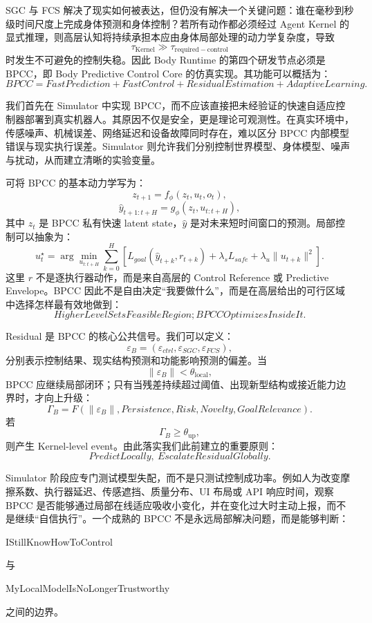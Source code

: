 SGC 与 FCS 解决了现实如何被表达，但仍没有解决一个关键问题：谁在毫秒到秒级时间尺度上完成身体预测和身体控制？若所有动作都必须经过 Agent Kernel 的显式推理，则高层认知将持续承担本应由身体局部处理的动力学复杂度，导致
\[
\tau_{\mathrm{Kernel}}
\gg
\tau_{\mathrm{required-control}}
\]
时发生不可避免的控制失稳。因此 Body Runtime 的第四个研发节点必须是 BPCC，即 Body Predictive Control Core 的仿真实现。其功能可以概括为：
\[
\boxed{
BPCC=
FastPrediction+
FastControl+
ResidualEstimation+
AdaptiveLearning.
}
\]

我们首先在 Simulator 中实现 BPCC，而不应该直接把未经验证的快速自适应控制器部署到真实机器人。其原因不仅是安全，更是理论可观测性。在真实环境中，传感噪声、机械误差、网络延迟和设备故障同时存在，难以区分 BPCC 内部模型错误与现实执行误差。Simulator 则允许我们分别控制世界模型、身体模型、噪声与扰动，从而建立清晰的实验变量。

可将 BPCC 的基本动力学写为：
\[
z_{t+1}
=
f_\phi(z_t,u_t,o_t),
\]
\[
\hat y_{t+1:t+H}
=
g_\phi(z_t,u_{t:t+H}),
\]
其中 $z_t$ 是 BPCC 私有快速 latent state，$\hat y$ 是对未来短时间窗口的预测。局部控制可以抽象为：
\[
u_t^\star
=
\arg\min_{u_{t:t+H}}
\sum_{k=0}^{H}
\left[
L_{goal}(\hat y_{t+k},r_{t+k})
+
\lambda_sL_{safe}
+
\lambda_u\|u_{t+k}\|^2
\right].
\]
这里 $r$ 不是逐执行器动作，而是来自高层的 Control Reference 或 Predictive Envelope。BPCC 因此不是自由决定“我要做什么”，而是在高层给出的可行区域中选择怎样最有效地做到：
\[
\boxed{
HigherLevelSetsFeasibleRegion;
BPCCOptimizesInsideIt.
}
\]

Residual 是 BPCC 的核心公共信号。我们可以定义：
\[
\varepsilon_B
=
\left(
\varepsilon_{ctrl},
\varepsilon_{SGC},
\varepsilon_{FCS}
\right),
\]
分别表示控制结果、现实结构预测和功能影响预测的偏差。当
\[
\|\varepsilon_B\|
<
\theta_{\mathrm{local}},
\]
BPCC 应继续局部闭环；只有当残差持续超过阈值、出现新型结构或接近能力边界时，才向上升级：
\[
\Gamma_B
=
F(
\|\varepsilon_B\|,
Persistence,
Risk,
Novelty,
GoalRelevance
).
\]
若
\[
\Gamma_B\geq\theta_{\mathrm{up}},
\]
则产生 Kernel-level event。由此落实我们此前建立的重要原则：
\[
\boxed{
PredictLocally,\ EscalateResidualGlobally.
}
\]

Simulator 阶段应专门测试模型失配，而不是只测试控制成功率。例如人为改变摩擦系数、执行器延迟、传感遮挡、质量分布、UI 布局或 API 响应时间，观察 BPCC 是否能够通过局部在线适应吸收小变化，并在变化过大时主动上报，而不是继续“自信执行”。一个成熟的 BPCC 不是永远局部解决问题，而是能够判断：
\begin{statementbox}
IStillKnowHowToControl
\end{statementbox}
与
\begin{statementbox}
MyLocalModelIsNoLongerTrustworthy
\end{statementbox}
之间的边界。

